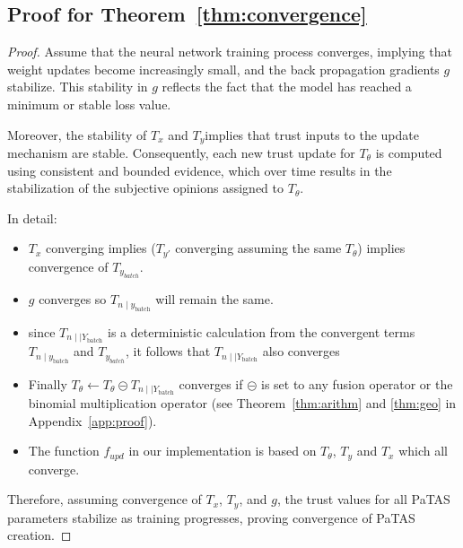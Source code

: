 \subsection{Proof for Theorem~\ref{thm:convergence}}
\begin{proof}
Assume that the neural network training process converges, implying that weight updates become increasingly small, and the back propagation gradients \( g \) stabilize. This stability in \( g \) reflects the fact that the model has reached a minimum or stable loss value.

Moreover, the stability of \( T_x \) and \( T_y \)implies that trust inputs to the update mechanism are stable. Consequently, each new trust update for \( T_{\theta} \) is computed using consistent and bounded evidence, which over time results in the stabilization of the subjective opinions assigned to \( T_{\theta} \).

In detail:
\begin{itemize}
    \item \(T_x\) converging implies (\(T_{y\prime}\) converging assuming the same \(T_\theta\)) implies convergence of \(T_{y_{batch}}\).

    \item \(g\) converges so \(T_{n \mid y_\text{batch}}\) will remain the same. 
    
    \item since \(T_{n\mid \mid {Y_\text{batch}}}\) is a deterministic calculation from the convergent terms  \(T_{n \mid y_\text{batch}}\) and \(T_{y_{batch}}\), it follows that \(T_{n\mid \mid {Y_\text{batch}}}\) also converges 

    \item Finally \(T_{\theta} \longleftarrow T_{\theta} \circleddash T_{n\mid \mid {Y_\text{batch}}}\) converges if \(\circleddash\) is set to any fusion operator or the binomial multiplication operator (see Theorem~\ref{thm:arithm} and \ref{thm:geo} in Appendix~\ref{app:proof}). 

    \item The function \(f_{upd}\) in our implementation is based on \(T_{\theta}\), \(T_{y}\) and \({T_{x}}\) which all converge.
\end{itemize}

Therefore, assuming convergence of $T_x$, $T_y$, and $g$, the trust values for all PaTAS parameters stabilize as training progresses, proving convergence of PaTAS creation. 
\end{proof}





